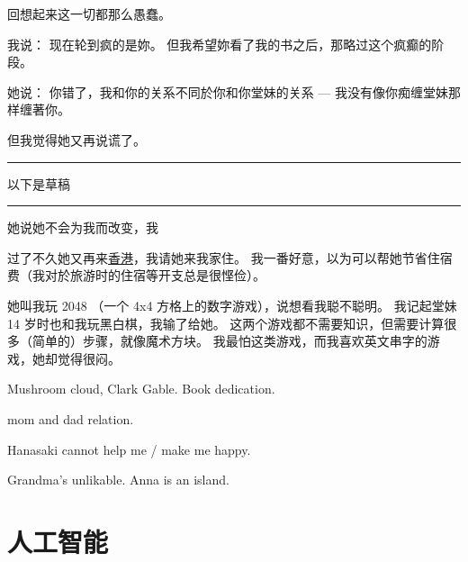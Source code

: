 \documentclass[12pt]{report}
\newcommand*\todo{\begin{center}\color{red}  \rule{5cm}{0.5pt} 以下是草稿\, \rule{5cm}{0.5pt} \end{center}}
\begin{document}
{回想起来这一切都那么愚蠢。

我说： 现在轮到疯的是妳。  但我希望妳看了我的书之后，那略过这个疯癫的阶段。

她说： 你错了，我和你的关系不同於你和你堂妹的关系 --- 我没有像你痴缠堂妹那样缠著你。

但我觉得她又再说谎了。

\todo

她说她不会为我而改变，我

过了不久她又再来\uline{香港}，我请她来我家住。 我一番好意，以为可以帮她节省住宿费（我对於旅游时的住宿等开支总是很悭俭）。


她叫我玩 2048 （一个 4x4 方格上的数字游戏），说想看我聪不聪明。 我记起堂妹 14 岁时也和我玩黑白棋，我输了给她。  这两个游戏都不需要知识，但需要计算很多（简单的）步骤，就像魔术方块。  我最怕这类游戏，而我喜欢英文串字的游戏，她却觉得很闷。

Mushroom cloud, Clark Gable.  Book dedication.

mom and dad relation.

Hanasaki cannot help me / make me happy.

Grandma's unlikable.  Anna is an island.

\chapter{人工智能}

}
\end{document}
